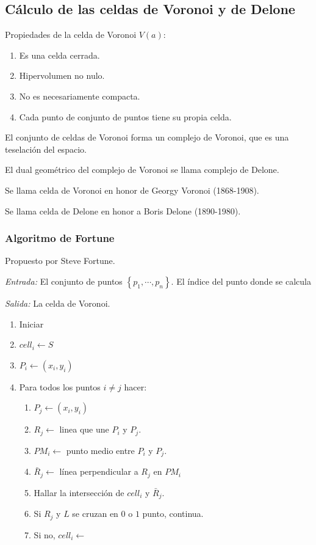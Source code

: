 \subsection{Cálculo de las celdas de Voronoi y de Delone}

Propiedades de la celda de Voronoi $V(a)$:

\begin{enumerate}
    \item Es una celda cerrada.
    \item Hipervolumen no nulo.
    \item No es necesariamente compacta.
    \item Cada punto de conjunto de puntos tiene su propia celda.
\end{enumerate}

El conjunto de celdas de Voronoi forma un complejo de Voronoi, que es una teselación del espacio.

El dual geométrico del complejo de Voronoi se llama complejo de Delone.

Se llama celda de Voronoi en honor de Georgy  Voronoi (1868-1908).

Se llama celda de Delone en honor a Boris Delone (1890-1980).


\subsubsection{Algoritmo de Fortune}

Propuesto por Steve Fortune. 

\textit{Entrada:} El conjunto de puntos $\left\{p_1,\cdots,p_n\right\}$. El índice del punto donde se calcula 

\textit{Salida:} La celda de Voronoi.

\begin{enumerate}
    \item Iniciar
    \item $cell_i\leftarrow S$
    \item $P_i\leftarrow (x_i,y_i)$
    \item Para todos los puntos $i\neq j$ hacer:
    \begin{enumerate}
        \item $P_j\leftarrow (x_i,y_i)$
        \item $R_j\leftarrow $ linea que une $P_i$ y $P_j$.
        \item $PM_i\leftarrow$ punto medio entre $P_i$ y $P_j$.
        \item $\bar{R}_j\leftarrow$ línea perpendicular a $R_j$ en $PM_i$
        \item Hallar la intersección de $cell_i$ y $\bar{R}_j$.
        \item Si $R_j$ y $L$ se cruzan en $0$ o $1$ punto, continua.
        \item Si no, $cell_i\leftarrow$
    \end{enumerate}
\end{enumerate}


